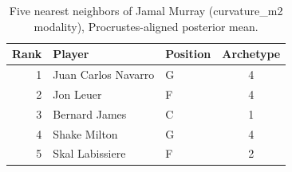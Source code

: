\begin{table}[htbp]
  \centering\small
  \begin{tabular}{rllc}
    \toprule
    Rank & Player & Position & Archetype \\
    \midrule
    1 & Juan Carlos Navarro & G & 4 \\
    2 & Jon Leuer & F & 4 \\
    3 & Bernard James & C & 1 \\
    4 & Shake Milton & G & 4 \\
    5 & Skal Labissiere & F & 2 \\
    \bottomrule
  \end{tabular}
  \caption{Five nearest neighbors of Jamal Murray (curvature_m2 modality), Procrustes-aligned posterior mean.}
  \label{tab:Jamal_Murray_neighbors_curvature_m2}
\end{table}

